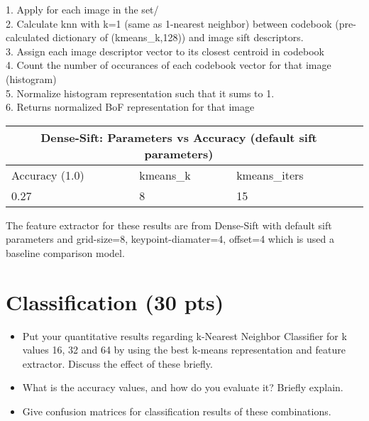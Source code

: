 \documentclass[12pt]{article}
\begin{document}
\begin{center}
        1. Apply for each image in the set/ \\
        2. Calculate knn with k=1 (same as 1-nearest neighbor) between codebook (pre-calculated dictionary of (kmeans\_k,128)) and image sift descriptors. \\
        3. Assign each image descriptor vector to its closest centroid in codebook \\
        4. Count the number of occurances of each codebook vector for that image (histogram) \\
        5. Normalize histogram representation such that it sums to 1. \\
        6. Returns normalized BoF representation for that image
    \end{center}

    \vspace*{0.5cm}
        \begin{tabular}{ |p{1.5cm}||p{3cm}|p{3cm}|p{3cm}| }
            \hline
            \multicolumn{3}{|c|}{Dense-Sift: Parameters vs Accuracy (default sift parameters)} \\
            \hline
            Accuracy (1.0)  & kmeans\_k & kmeans\_iters\\
            \hline
            0.27 & 8 & 15 \\ %
            \hline
        \end{tabular}
       
        \begin{center}
            \raggedright
            The feature extractor for these results are from Dense-Sift with default sift parameters and grid-size=8, keypoint-diamater=4, offset=4 which is used a baseline comparison model.

        \end{center}

\section{Classification (30 pts)}
    \begin{itemize}
        \item Put your quantitative results regarding k-Nearest Neighbor Classifier for k values 16, 32 and 64 by using the best k-means representation and feature extractor. Discuss the effect of these briefly.
        \item What is the accuracy values, and how do you evaluate it? Briefly explain.
        \item Give confusion matrices for classification results of these combinations.
    \end{itemize}
\end{document}
